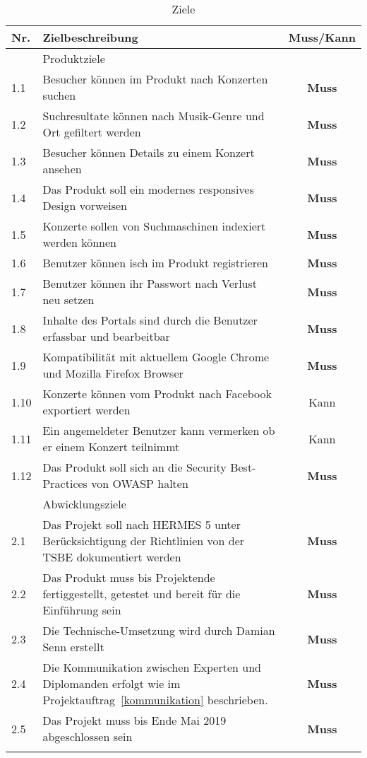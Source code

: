 \begin{longtable}[]{@{}lp{10.5cm}c@{}}
  \toprule
  Nr.  & Zielbeschreibung                                                                                                                 & Muss/Kann\tabularnewline
  \toprule
       & Produktziele\tabularnewline
  \midrule
  1.1  & Besucher können im Produkt nach Konzerten suchen                                                                                 & \textbf{Muss}\tabularnewline
  1.2  & Suchresultate können nach Musik-Genre und Ort gefiltert werden                                                                   & \textbf{Muss}\tabularnewline
  1.3  & Besucher können Details zu einem Konzert ansehen                                                                                 & \textbf{Muss}\tabularnewline
  1.4  & Das Produkt soll ein modernes responsives Design vorweisen                                                                       & \textbf{Muss}\tabularnewline
  1.5  & Konzerte sollen von Suchmaschinen indexiert werden können                                                                        & \textbf{Muss}\tabularnewline
  1.6  & Benutzer können isch im Produkt registrieren                                                                                     & \textbf{Muss}\tabularnewline
  1.7  & Benutzer können ihr Passwort nach Verlust neu setzen                                                                             & \textbf{Muss}\tabularnewline
  1.8  & Inhalte des Portals sind durch die Benutzer erfassbar und bearbeitbar                                                            & \textbf{Muss}\tabularnewline
  1.9  & Kompatibilität mit aktuellem Google Chrome und Mozilla Firefox Browser                                                           & \textbf{Muss}\tabularnewline
  1.10 & Konzerte können vom Produkt nach Facebook exportiert werden                                                                      & Kann\tabularnewline
  1.11 & Ein angemeldeter Benutzer kann vermerken ob er einem Konzert teilnimmt                                                           & Kann\tabularnewline
  1.12 & Das Produkt soll sich an die Security Best-Practices von OWASP halten                                                            & \textbf{Muss}\tabularnewline
  \bottomrule
       & Abwicklungsziele\tabularnewline
  \midrule
  2.1  & Das Projekt soll nach HERMES 5 unter Berücksichtigung der Richtlinien von der TSBE dokumentiert werden & \textbf{Muss}\tabularnewline
  2.2  & Das Produkt muss bis Projektende fertiggestellt, getestet und bereit für die Einführung sein     & \textbf{Muss}\tabularnewline
  2.3  & Die Technische-Umsetzung wird durch Damian Senn erstellt                                                                         & \textbf{Muss}\tabularnewline
  2.4  & Die Kommunikation zwischen Experten und Diplomanden erfolgt wie im Projektauftrag~\ref{kommunikation} beschrieben. & \textbf{Muss}\tabularnewline
  2.5  & Das Projekt muss bis Ende Mai 2019 abgeschlossen sein                                                                            & \textbf{Muss}\tabularnewline
  \bottomrule
  \caption{Ziele}
\end{longtable}
